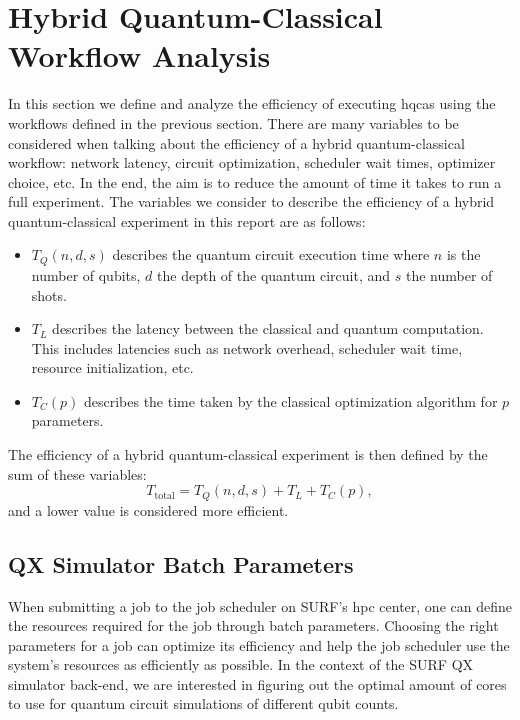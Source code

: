 \section{Hybrid Quantum-Classical Workflow Analysis}
In this section we define and analyze the efficiency of executing \glspl{hqca} using the workflows defined in the previous section.
There are many variables to be considered when talking about the efficiency of a hybrid quantum-classical workflow: network latency, circuit optimization, scheduler wait times, optimizer choice, etc.
In the end, the aim is to reduce the amount of time it takes to run a full experiment.
The variables we consider to describe the efficiency of a hybrid quantum-classical experiment in this report are as follows:
\begin{itemize}
    \item $T_Q(n, d, s)$ describes the quantum circuit execution time where $n$ is the number of qubits, $d$ the depth of the quantum circuit, and $s$ the number of shots.
    \item $T_L$ describes the latency between the classical and quantum computation. This includes latencies such as network overhead, scheduler wait time, resource initialization, etc.
    \item $T_C(p)$ describes the time taken by the classical optimization algorithm for $p$ parameters.
\end{itemize}
The efficiency of a hybrid quantum-classical experiment is then defined by the sum of these variables:
\begin{equation}
T_\text{total} = T_Q(n, d, s) + T_L + T_C(p),
\end{equation}
and a lower value is considered more efficient.

\subsection{QX Simulator Batch Parameters}
When submitting a job to the job scheduler on SURF's \gls{hpc} center, one can define the resources required for the job through batch parameters.
Choosing the right parameters for a job can optimize its efficiency and help the job scheduler use the system's resources as efficiently as possible.
In the context of the SURF QX simulator back-end, we are interested in figuring out the optimal amount of cores to use for quantum circuit simulations of different qubit counts.


